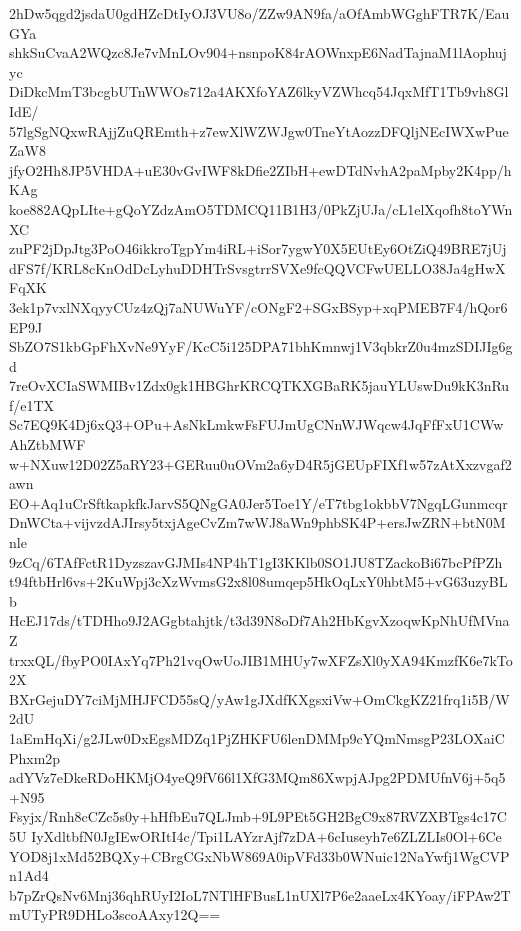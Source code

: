 2hDw5qgd2jsdaU0gdHZcDtIyOJ3VU8o/ZZw9AN9fa/aOfAmbWGghFTR7K/EauGYa
shkSuCvaA2WQzc8Je7vMnLOv904+nsnpoK84rAOWnxpE6NadTajnaM1lAophujyc
DiDkcMmT3bcgbUTnWWOs712a4AKXfoYAZ6lkyVZWhcq54JqxMfT1Tb9vh8GlIdE/
57lgSgNQxwRAjjZuQREmth+z7ewXlWZWJgw0TneYtAozzDFQljNEcIWXwPueZaW8
jfyO2Hh8JP5VHDA+uE30vGvIWF8kDfie2ZIbH+ewDTdNvhA2paMpby2K4pp/hKAg
koe882AQpLIte+gQoYZdzAmO5TDMCQ11B1H3/0PkZjUJa/cL1elXqofh8toYWnXC
zuPF2jDpJtg3PoO46ikkroTgpYm4iRL+iSor7ygwY0X5EUtEy6OtZiQ49BRE7jUj
dFS7f/KRL8cKnOdDcLyhuDDHTrSvsgtrrSVXe9fcQQVCFwUELLO38Ja4gHwXFqXK
3ek1p7vxlNXqyyCUz4zQj7aNUWuYF/cONgF2+SGxBSyp+xqPMEB7F4/hQor6EP9J
SbZO7S1kbGpFhXvNe9YyF/KcC5i125DPA71bhKmnwj1V3qbkrZ0u4mzSDIJIg6gd
7reOvXCIaSWMIBv1Zdx0gk1HBGhrKRCQTKXGBaRK5jauYLUswDu9kK3nRuf/e1TX
Sc7EQ9K4Dj6xQ3+OPu+AsNkLmkwFsFUJmUgCNnWJWqcw4JqFfFxU1CWwAhZtbMWF
w+NXuw12D02Z5aRY23+GERuu0uOVm2a6yD4R5jGEUpFIXf1w57zAtXxzvgaf2awn
EO+Aq1uCrSftkapkfkJarvS5QNgGA0Jer5Toe1Y/eT7tbg1okbbV7NgqLGunmcqr
DnWCta+vijvzdAJIrsy5txjAgeCvZm7wWJ8aWn9phbSK4P+ersJwZRN+btN0Mnle
9zCq/6TAfFctR1DyzszavGJMIs4NP4hT1gI3KKlb0SO1JU8TZackoBi67bcPfPZh
t94ftbHrl6vs+2KuWpj3cXzWvmsG2x8l08umqep5HkOqLxY0hbtM5+vG63uzyBLb
HcEJ17ds/tTDHho9J2AGgbtahjtk/t3d39N8oDf7Ah2HbKgvXzoqwKpNhUfMVnaZ
trxxQL/fbyPO0IAxYq7Ph21vqOwUoJIB1MHUy7wXFZsXl0yXA94KmzfK6e7kTo2X
BXrGejuDY7ciMjMHJFCD55sQ/yAw1gJXdfKXgsxiVw+OmCkgKZ21frq1i5B/W2dU
1aEmHqXi/g2JLw0DxEgsMDZq1PjZHKFU6lenDMMp9cYQmNmsgP23LOXaiCPhxm2p
adYVz7eDkeRDoHKMjO4yeQ9fV66l1XfG3MQm86XwpjAJpg2PDMUfnV6j+5q5+N95
Fsyjx/Rnh8cCZc5s0y+hHfbEu7QLJmb+9L9PEt5GH2BgC9x87RVZXBTgs4c17C5U
IyXdltbfN0JgIEwORItI4c/Tpi1LAYzrAjf7zDA+6cIuseyh7e6ZLZLIs0Ol+6Ce
YOD8j1xMd52BQXy+CBrgCGxNbW869A0ipVFd33b0WNuic12NaYwfj1WgCVPn1Ad4
b7pZrQsNv6Mnj36qhRUyI2IoL7NTlHFBusL1nUXl7P6e2aaeLx4KYoay/iFPAw2T
mUTyPR9DHLo3scoAAxy12Q==
